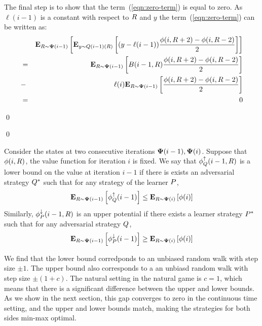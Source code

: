 \documentclass{article}[12pt]
\begin{document}
\begin{enumerate}
The final step is to show that the term~(\ref{eqn:zero-term}) is equal
to zero. As $\ell(i-1)$ is a constant with respect to $R$ and $y$ the
term~(\ref{eqn:zero-term}) can be written as:
\begin{eqnarray}
&&{\bf E}_{R \sim {\bf \Psi}(i-1)}\left[ {\bf E}_{y \sim Q(i-1)(R)}\left[ (y-\ell(i-1))
   \frac{\phi(i,R+2)-\phi(i,R-2)}{2} \right] \right]\\
&=&
{\bf E}_{R \sim {\bf \Psi}(i-1)}\left[ B(i-1,R)
    \frac{\phi(i,R+2)-\phi(i,R-2)}{2} \right]\\
  &-& \ell(i) {\bf E}_{R \sim {\bf \Psi}(i-1)}\left[ 
    \frac{\phi(i,R+2)-\phi(i,R-2)}{2} \right]\\
  &=& 0
\end{eqnarray}
\end{enumerate}
\qed



\qed

\iffalse
Consider the states at two consecutive iterations ${\bf \Psi}(i-1),{\bf \Psi}(i)$.
Suppose that $\phi(i,R)$, the value function for iteration $i$ is fixed.
We say that $\phi_{Q}^{\uparrow}(i-1,R)$ is a lower bound on the value at iteration
$i-1$ if there is exists an adversarial strategy $Q^*$ such that
for any strategy of the learner $P$, 
$$ {\bf E}_{R \sim {\bf \Psi}(i-1)}\left[ \phi_{Q}^{\uparrow}(i-1) \right] \leq {\bf E}_{R \sim {\bf \Psi}(i)}\left[ \phi(i) \right]$$
Similarly, $\phi_{P}^{\downarrow}(i-1,R)$ is an upper potential if there exists a
learner strategy $P^*$ such that for any adversarial strategy
$Q$,
$$ {\bf E}_{R \sim {\bf \Psi}(i-1)}\left[ \phi_{P}^{\downarrow}(i-1) \right] \geq {\bf E}_{R \sim {\bf \Psi}(i)}\left[ \phi(i) \right]$$



  We find that the lower bound corredponds to an unbiased random
  walk with step size $\pm 1$. The upper bound also corresponds to a an
  unbiasd random walk with step size $\pm(1+c)$. The natural setting
  in the natural game is $c=1$, which means that there is a
  significant difference between the upper and lower bounds. As we
  show in the next section, this gap converges to zero in the
  continuous time setting, and the upper and lower bounds match,
  making the strategies for both sides min-max optimal. 
\end{document}
